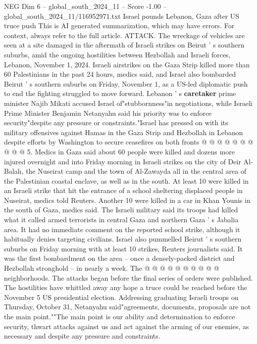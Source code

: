 \begin{textsample}{NEG Dim 6 – global\_south\_2024\_11 – Score -1.00 – global\_south\_2024\_11/116952971.txt}  \label{ex:f6_neg_110}
Israel pounds Lebanon, Gaza after US truce push This is AI generated summarization, which may have errors.
For context, always refer to the full article.
ATTACK.
The wreckage of vehicles are seen at a site damaged in the aftermath of Israeli strikes on Beirut ' s southern suburbs, amid the ongoing hostilities between Hezbollah and Israeli forces, Lebanon, November 1, 2024.
Israeli airstrikes on the Gaza Strip killed more than 60 Palestinians in the past 24 hours, medics said, and Israel also bombarded Beirut ' s southern suburbs on Friday, November 1, as a US-led diplomatic push to end the fighting struggled to move forward.
Lebanon ' s \textbf{caretaker} prime minister Najib Mikati accused Israel of"stubbornness"in negotiations, while Israeli Prime Minister Benjamin Netanyahu said his priority was to enforce security"despite any pressure or constraints."Israel has pressed on with its military offensives against Hamas in the Gaza Strip and Hezbollah in Lebanon despite efforts by Washington to secure ceasefires on both fronts @ @ @ @ @ @ @ @ @ @ 5.
Medics in Gaza said about 60 people were killed and dozens more injured overnight and into Friday morning in Israeli strikes on the city of Deir Al-Balah, the Nuseirat camp and the town of Al-Zawayda all in the central area of the Palestinian coastal enclave, as well as in the south.
At least 10 were killed in an Israeli strike that hit the entrance of a school sheltering displaced people in Nuseirat, medics told Reuters.
Another 10 were killed in a car in Khan Younis in the south of Gaza, medics said.
The Israeli military said its troops had killed what it called armed terrorists in central Gaza and northern Gaza ' s Jabalia area.
It had no immediate comment on the reported school strike, although it habitually denies targeting civilians.
Israel also pummelled Beirut ' s southern suburbs on Friday morning with at least 10 strikes, Reuters journalists said.
It was the first bombardment on the area -- once a densely-packed district and Hezbollah stronghold -- in nearly a week.
The @ @ @ @ @ @ @ @ @ @ neighborhoods.
The attacks began before the final series of orders were published.
The hostilities have whittled away any hope a truce could be reached before the November 5 US presidential election.
Addressing graduating Israeli troops on Thursday, October 31, Netanyahu said"agreements, documents, proposals are not the main point.""The main point is our ability and determination to enforce security, thwart attacks against us and act against the arming of our enemies, as necessary and despite any pressure and constraints.

\end{textsample}

